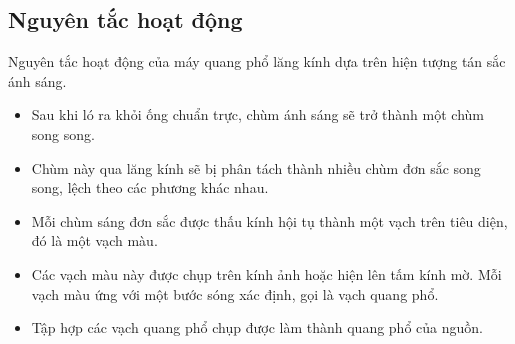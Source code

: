 \subsection{Nguyên tắc hoạt động}
Nguyên tắc hoạt động của máy quang phổ lăng kính dựa trên hiện tượng tán sắc ánh sáng.
\begin{itemize}
	
	\item Sau khi ló ra khỏi ống chuẩn trực, chùm ánh sáng sẽ trở thành một chùm song song. 
	
	\item Chùm này qua lăng kính sẽ bị phân tách thành nhiều chùm đơn sắc song song, lệch theo các phương khác nhau. 
	
	\item Mỗi chùm sáng đơn sắc được thấu kính hội tụ thành một vạch trên tiêu diện, đó là một vạch màu. 
	
	\item Các vạch màu này được chụp trên kính ảnh hoặc hiện lên tấm kính mờ. Mỗi vạch màu ứng với một bước sóng xác định, gọi là vạch quang phổ. 
	\item Tập hợp các vạch quang phổ chụp được làm thành quang phổ của nguồn.
	
\end{itemize}
